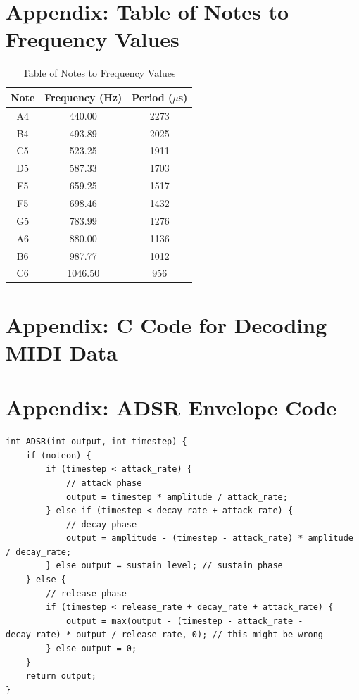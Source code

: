 \documentclass[12pt]{article}
\begin{document}
\break

\appendix

\section{Appendix: Table of Notes to Frequency Values}\label{sec:-table-of-notes-to-frequency-values}




\begin{table}[H]
    \centering
    \begin{tabular}{|c|c|c|}
    \hline
    Note & Frequency (Hz) & Period ($\mu$s) \\
    \hline
        A4 & 440.00 & 2273 \\
        B4 & 493.89 & 2025 \\
        C5 & 523.25 & 1911 \\
        D5 & 587.33 & 1703 \\
        E5 & 659.25 & 1517 \\
        F5 & 698.46 & 1432 \\
        G5 & 783.99 & 1276 \\
        A6 & 880.00 & 1136 \\
        B6 & 987.77 & 1012 \\
        C6 & 1046.50 & 956 \\
        \hline
    \end{tabular}
    \caption{Table of Notes to Frequency Values}
    \label{tab:pianonotestofrequency}
\end{table}

\section{Appendix: C Code for Decoding MIDI Data}\label{sec:appendix-b:-c-code-for-decoding-midi-data}


\section{Appendix: ADSR Envelope Code}\label{sec:appendix-c:-adsr-envelope-code}

\begin{lstlisting}
int ADSR(int output, int timestep) {
    if (noteon) {
        if (timestep < attack_rate) {
            // attack phase
            output = timestep * amplitude / attack_rate;
        } else if (timestep < decay_rate + attack_rate) {
            // decay phase
            output = amplitude - (timestep - attack_rate) * amplitude / decay_rate;
        } else output = sustain_level; // sustain phase
    } else {
        // release phase
        if (timestep < release_rate + decay_rate + attack_rate) {
            output = max(output - (timestep - attack_rate - decay_rate) * output / release_rate, 0); // this might be wrong
        } else output = 0;
    }
    return output;
}
\end{lstlisting}
\end{document}

